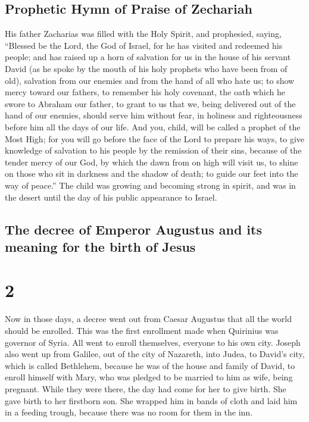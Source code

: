 \hypertarget{prophetic-hymn-of-praise-of-zechariah}{%
\subsection{Prophetic Hymn of Praise of
Zechariah}\label{prophetic-hymn-of-praise-of-zechariah}}

 His father Zacharias was filled with the Holy Spirit,
and prophesied, saying,  ``Blessed be the Lord, the God
of Israel, for he has visited and redeemed his people; 
and has raised up a horn of salvation for us in the house of his servant
David  (as he spoke by the mouth of his holy prophets who
have been from of old),  salvation from our enemies and
from the hand of all who hate us;  to show mercy toward
our fathers, to remember his holy covenant,  the oath
which he swore to Abraham our father,  to grant to us
that we, being delivered out of the hand of our enemies, should serve
him without fear,  in holiness and righteousness before
him all the days of our life.  And you, child, will be
called a prophet of the Most High; for you will go before the face of
the Lord to prepare his ways,  to give knowledge of
salvation to his people by the remission of their sins, 
because of the tender mercy of our God, by which the dawn from on high
will visit us,  to shine on those who sit in darkness and
the shadow of death; to guide our feet into the way of peace.''
 The child was growing and becoming strong in spirit, and
was in the desert until the day of his public appearance to Israel.

\hypertarget{the-decree-of-emperor-augustus-and-its-meaning-for-the-birth-of-jesus}{%
\subsection{The decree of Emperor Augustus and its meaning for the birth
of
Jesus}\label{the-decree-of-emperor-augustus-and-its-meaning-for-the-birth-of-jesus}}

\hypertarget{section-1}{%
\section{2}\label{section-1}}

 Now in those days, a decree went out from Caesar Augustus
that all the world should be enrolled.  This was the first
enrollment made when Quirinius was governor of Syria.  All
went to enroll themselves, everyone to his own city. 
Joseph also went up from Galilee, out of the city of Nazareth, into
Judea, to David's city, which is called Bethlehem, because he was of the
house and family of David,  to enroll himself with Mary,
who was pledged to be married to him as wife, being pregnant.
 While they were there, the day had come for her to give
birth.  She gave birth to her firstborn son. She wrapped
him in bands of cloth and laid him in a feeding trough, because there
was no room for them in the inn.

